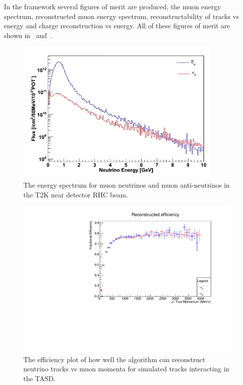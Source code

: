 In the framework several figures of merit are produced, the muon energy spectrum, reconstructed muon energy spectrum, reconstructability of tracks vs energy and charge reconstruction vs energy. All of these figures of merit are shown in~ and~.

\begin{figure}[h!]
\centering
\includegraphics[width=0.9\textwidth]{figures/WAGASCIflux.jpeg}
\caption{The energy spectrum for muon neutrinos and muon anti-neutrinos in the T2K near detector RHC beam.}
\label{fig:T2KndSpectrum}
\end{figure}

\begin{figure}[h!]
\centering
\includegraphics[width=.9\textwidth]{figures/NeutrinoChap/data260618/T2K/FittedT2KNeutrinoBeamMIND.pdf}
\caption{The efficiency plot of how well the algorithm can reconstruct neutrino tracks vs muon momenta for simulated tracks interacting in the TASD.}
\label{fig:T2KTASDfitted}
\end{figure}


